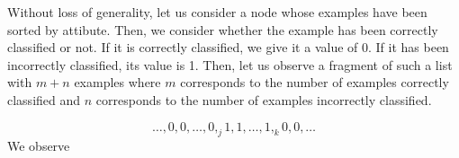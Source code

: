\documentclass{article}
\begin{document}
Without loss of generality, let us consider a node whose examples have been sorted by attibute. Then, we consider whether the example has been correctly classified or not. If it is correctly classified, we give it a value of 0. If it has been incorrectly classified, its value is 1. Then, let us observe a fragment of such a list with \(m + n\) examples where \(m\) corresponds to the number of examples correctly classified and \(n\) corresponds to the number of examples incorrectly classified.

\begin{equation*}
\ldots,0,0,\ldots,0,_j1,1,\ldots,1,_k0,0,\ldots
\end{equation*}
We observe 
\end{document}
